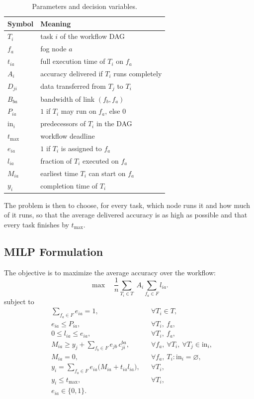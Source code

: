 \documentclass[conference]{IEEEtran}
\begin{document}
\begin{table}[t]
\centering
\caption{Parameters and decision variables.}
\label{tab:notation}
\small
\begin{tabular}{ll}
\toprule
\textbf{Symbol} & \textbf{Meaning} \\
\midrule
$T_i$ & task $i$ of the workflow DAG \\
$f_a$ & fog node $a$ \\
$t_{ia}$ & full execution time of $T_i$ on $f_a$ \\
$A_i$ & accuracy delivered if $T_i$ runs completely \\
$D_{ji}$ & data transferred from $T_j$ to $T_i$ \\
$B_{ba}$ & bandwidth of link $(f_b,f_a)$ \\
$P_{ia}$ & $1$ if $T_i$ may run on $f_a$, else $0$ \\
$\mathrm{in}_i$ & predecessors of $T_i$ in the DAG \\
$t_{\max}$ & workflow deadline \\
\midrule
$e_{ia}$ & $1$ if $T_i$ is assigned to $f_a$ \\
$l_{ia}$ & fraction of $T_i$ executed on $f_a$ \\
$M_{ia}$ & earliest time $T_i$ can start on $f_a$ \\
$y_i$ & completion time of $T_i$ \\
\bottomrule
\end{tabular}
\end{table}

The problem is then to choose, for every task, which node runs it and how much of it runs, so that the average delivered accuracy is as high as possible and that every task finishes by $t_{\max}$.

\subsection{MILP Formulation}
\label{sec:milp}

The objective is to maximize the average accuracy over the workflow:
\begin{equation}
 \max \quad \frac{1}{n}\sum_{T_i\in T}\; A_i\sum_{f_a\in F} l_{ia}.
\label{eq:obj}
\end{equation}
subject to
\begin{align}
 &\sum_{f_a\in F} e_{ia} =1, && \forall T_i\in T, \label{eq:one}\\
 &e_{ia} \le P_{ia}, && \forall T_i,\ f_a, \label{eq:elig}\\
 &0 \le l_{ia} \le e_{ia}, && \forall T_i,\ f_a, \label{eq:frac}\\
 &M_{ia} \ge y_j+\sum_{f_b\in F} e_{jb}\,c_{ji}^{ba}, && \forall f_a,\ \forall T_i,\ \forall T_j\in\mathrm{in}_i, \label{eq:start}\\
 &M_{ia} =0, && \forall f_a,\ T_i:\mathrm{in}_i=\varnothing, \label{eq:startsrc}\\
 &y_i =\sum_{f_a\in F} e_{ia}\bigl(M_{ia}+t_{ia}l_{ia}\bigr), && \forall T_i, \label{eq:compl}\\
 &y_i \le t_{\max}, && \forall T_i, \label{eq:deadline}\\
 &e_{ia} \in\{0,1\}. && \label{eq:bin}
\end{align}
\end{document}
